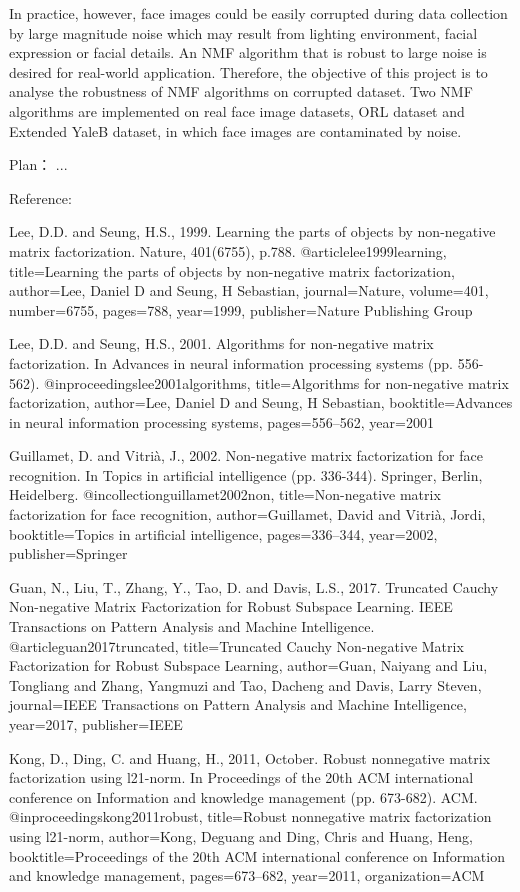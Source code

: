 In practice, however, face images could be easily corrupted during data collection by large magnitude noise which may result from lighting environment, facial expression or facial details. An NMF algorithm that is robust to large noise is desired for real-world application. Therefore, the objective of this project is to analyse the robustness of NMF algorithms on corrupted dataset. Two NMF algorithms are implemented on real face image datasets, ORL dataset and Extended YaleB dataset, in which face images are contaminated by noise.

Plan：
...



Reference:

Lee, D.D. and Seung, H.S., 1999. Learning the parts of objects by non-negative matrix factorization. Nature, 401(6755), p.788.
@article{lee1999learning,
  title={Learning the parts of objects by non-negative matrix factorization},
  author={Lee, Daniel D and Seung, H Sebastian},
  journal={Nature},
  volume={401},
  number={6755},
  pages={788},
  year={1999},
  publisher={Nature Publishing Group}
}


Lee, D.D. and Seung, H.S., 2001. Algorithms for non-negative matrix factorization. In Advances in neural information processing systems (pp. 556-562).
@inproceedings{lee2001algorithms,
  title={Algorithms for non-negative matrix factorization},
  author={Lee, Daniel D and Seung, H Sebastian},
  booktitle={Advances in neural information processing systems},
  pages={556--562},
  year={2001}
}

Guillamet, D. and Vitrià, J., 2002. Non-negative matrix factorization for face recognition. In Topics in artificial intelligence (pp. 336-344). Springer, Berlin, Heidelberg.
@incollection{guillamet2002non,
  title={Non-negative matrix factorization for face recognition},
  author={Guillamet, David and Vitri{\`a}, Jordi},
  booktitle={Topics in artificial intelligence},
  pages={336--344},
  year={2002},
  publisher={Springer}
}

Guan, N., Liu, T., Zhang, Y., Tao, D. and Davis, L.S., 2017. Truncated Cauchy Non-negative Matrix Factorization for Robust Subspace Learning. IEEE Transactions on Pattern Analysis and Machine Intelligence.
@article{guan2017truncated,
  title={Truncated Cauchy Non-negative Matrix Factorization for Robust Subspace Learning},
  author={Guan, Naiyang and Liu, Tongliang and Zhang, Yangmuzi and Tao, Dacheng and Davis, Larry Steven},
  journal={IEEE Transactions on Pattern Analysis and Machine Intelligence},
  year={2017},
  publisher={IEEE}
}

Kong, D., Ding, C. and Huang, H., 2011, October. Robust nonnegative matrix factorization using l21-norm. In Proceedings of the 20th ACM international conference on Information and knowledge management (pp. 673-682). ACM.
@inproceedings{kong2011robust,
  title={Robust nonnegative matrix factorization using l21-norm},
  author={Kong, Deguang and Ding, Chris and Huang, Heng},
  booktitle={Proceedings of the 20th ACM international conference on Information and knowledge management},
  pages={673--682},
  year={2011},
  organization={ACM}
}

